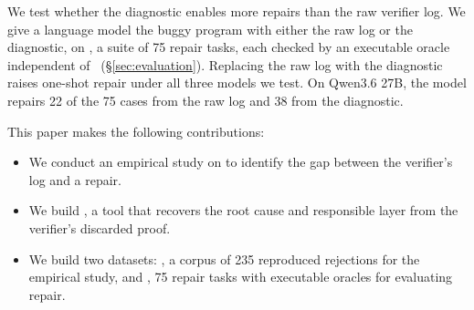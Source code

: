 We test whether the \sys diagnostic enables more repairs than the raw verifier log. We give a language model the buggy program with either the raw log or the \sys diagnostic, on \bench, a suite of 75 repair tasks, each checked by an executable oracle independent of \sys~(\S\ref{sec:evaluation}). Replacing the raw log with the diagnostic raises one-shot repair under all three models we test. On Qwen3.6 27B, the model repairs 22 of the 75 cases from the raw log and 38 from the diagnostic.

This paper makes the following contributions:
\begin{itemize}
\item We conduct an empirical study on \empiricalset to identify the gap between the verifier's log and a repair.
\item We build \sys, a tool that recovers the root cause and responsible layer from the verifier's discarded proof.
\item We build two datasets: \empiricalset, a corpus of 235 reproduced rejections for the empirical study, and \bench, 75 repair tasks with executable oracles for evaluating repair.
\end{itemize}



